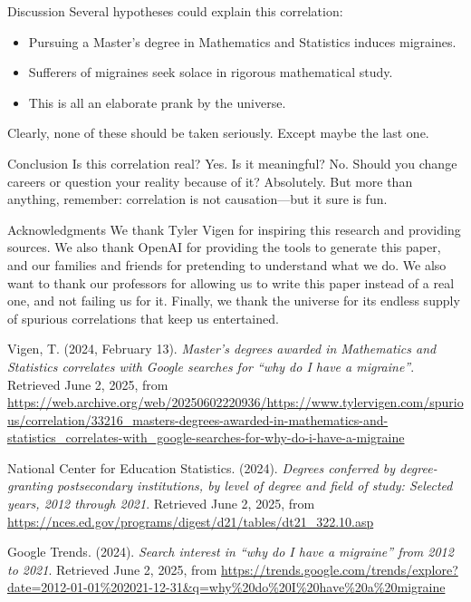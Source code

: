 \documentclass{article}
\begin{document}
\begin{section}{Discussion}
 Several hypotheses could explain this correlation:
 \begin{itemize}
   \item Pursuing a Master's degree in Mathematics and Statistics induces migraines.
   \item Sufferers of migraines seek solace in rigorous mathematical study.
   \item This is all an elaborate prank by the universe.
 \end{itemize}
 Clearly, none of these should be taken seriously. Except maybe the last one.
\end{section}

\begin{section}{Conclusion}
 Is this correlation real? Yes. Is it meaningful? No. Should you change careers or question your reality because of it? Absolutely. But more than anything, remember: correlation is not causation—but it sure is fun.
\end{section}

\begin{section}{Acknowledgments}
 We thank Tyler Vigen for inspiring this research and providing sources. We also thank OpenAI for providing the tools to generate this paper, and our families and friends for pretending to understand what we do.
 We also want to thank our professors for allowing us to write this paper instead of a real one, and not failing us for it. Finally, we thank the universe for its endless supply of spurious correlations that keep us entertained.
\end{section}


\begin{thebibliography}{9}

  Vigen, T. (2024, February 13). \textit{Master's degrees awarded in Mathematics and Statistics correlates with Google searches for ``why do I have a migraine''}. Retrieved June 2, 2025, from \url{https://web.archive.org/web/20250602220936/https://www.tylervigen.com/spurious/correlation/33216_masters-degrees-awarded-in-mathematics-and-statistics_correlates-with_google-searches-for-why-do-i-have-a-migraine}

  National Center for Education Statistics. (2024). \textit{Degrees conferred by degree-granting postsecondary institutions, by level of degree and field of study: Selected years, 2012 through 2021}. Retrieved June 2, 2025, from \url{https://nces.ed.gov/programs/digest/d21/tables/dt21_322.10.asp}

  Google Trends. (2024). \textit{Search interest in ``why do I have a migraine'' from 2012 to 2021}. Retrieved June 2, 2025, from \url{https://trends.google.com/trends/explore?date=2012-01-01%202021-12-31&q=why%20do%20I%20have%20a%20migraine}


\end{thebibliography}
\end{document}
